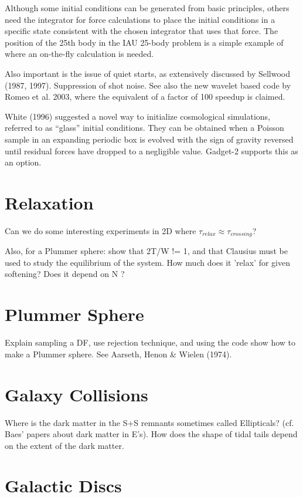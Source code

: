 Although some initial conditions can be generated from basic principles,
others need the
integrator for force calculations to place the initial conditions in a
specific state consistent with the chosen integrator that uses that force. 
The position of the 25th
body in the IAU 25-body problem is a simple 
example of where an on-the-fly calculation
is needed.

Also important is the issue of quiet starts, as extensively
discussed by Sellwood (1987, 1997). Suppression of shot noise.
See also the new wavelet based code by Romeo et al. 2003, where the
equivalent of a factor of 100 speedup is claimed.

White (1996) suggested a novel way to initialize cosmological simulations,
referred to as ``glass'' initial conditions. They can be obtained when
a Poisson sample in an expanding periodic box is evolved with the
sign of gravity reversed until residual forces have dropped to a negligible
value. Gadget-2 supports this as an option.


\section{Relaxation}

Can we do some interesting experiments in 2D where $\tau_{relax} \approx \tau_{crossing}$?


Also, for a Plummer sphere: show that 2T/W != 1, and that Clausius must be used to study
the equilibrium of the system. How much does it 'relax' for given softening?
Does it depend on N ?


\section{Plummer Sphere}

Explain sampling a DF, use rejection technique, and
using the code show how to make a Plummer sphere. See
Aarseth, Henon \& Wielen (1974).

\section{Galaxy Collisions}


Where is the dark matter in the S+S remnants sometimes called Ellipticals?
(cf. Baes' papers about dark matter in E's). How does the shape
of tidal tails depend on the extent of the dark matter.


\section{Galactic Discs}

